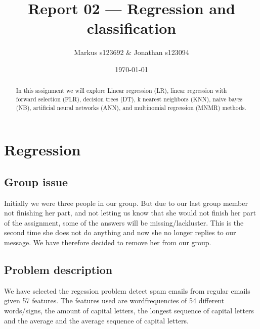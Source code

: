 \documentclass[10pt, paper=a4]{article}
\begin{document}
\title{Report 02 --- Regression and classification}

\author{Markus s123692 \& Jonathan s123094}

\date{\today}

\maketitle

\begin{abstract}
In this assignment we will explore Linear regression (LR), linear
regression with forward selection (FLR), decision trees (DT), k
nearest neighbors (KNN), naive bayes (NB), artificial neural networks
(ANN), and multinomial regression (MNMR) methods.


\end{abstract}

\section{Regression}
\label{sec:regression}
\subsection{Group issue}
Initially we were three people in our group. But due to our last group
member not finishing her part, and not letting us know that she would not
finish her part of the assignment, some of the answers will be
missing/lackluster. This is the second time she does not do
anything and now she no longer replies to our message. We have
therefore decided to remove her from our group.


\subsection{Problem description}
We have selected the regession problem detect spam emails from regular
emails given 57 features.  The features used are wordfrequencies of 54
different words/signs, the amount of capital letters, the longest
sequence of capital letters and the average and the average sequence
of capital letters.
\end{document}
